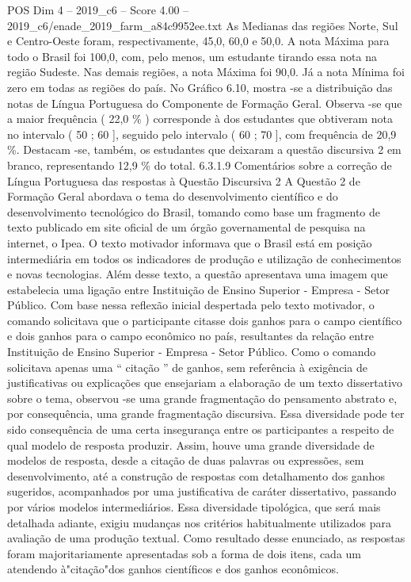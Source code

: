 \begin{textsample}{POS Dim 4 – 2019\_c6 – Score 4.00 – 2019\_c6/enade\_2019\_farm\_a84c9952ee.txt}
As Medianas das regiões Norte, Sul e Centro-Oeste foram, respectivamente, 45,0, 60,0 e 50,0.
A nota Máxima para todo o Brasil foi 100,0, com, pelo menos, um estudante tirando essa nota na região Sudeste.
Nas demais regiões, a nota Máxima foi 90,0.
Já a nota Mínima foi zero em todas as regiões do país.
No Gráfico 6.10, mostra -se a distribuição das notas de Língua Portuguesa do Componente de Formação Geral.
Observa -se que a maior frequência ( 22,0 \% ) corresponde à dos estudantes que obtiveram nota no intervalo ( 50 ; 60 ], seguido pelo intervalo ( 60 ; 70 ], com frequência de 20,9 \%.
Destacam -se, também, os estudantes que deixaram a questão discursiva 2 em branco, representando 12,9 \% do total. 6.3.1.9 Comentários sobre a correção de Língua Portuguesa das respostas à Questão Discursiva 2 A Questão 2 de Formação Geral abordava o tema do desenvolvimento científico e do desenvolvimento tecnológico do Brasil, tomando como base um fragmento de texto publicado em site oficial de um órgão governamental de pesquisa na internet, o Ipea.
O texto motivador informava que o Brasil está em posição intermediária em todos os indicadores de produção e utilização de conhecimentos e novas tecnologias.
Além desse texto, a questão apresentava uma imagem que estabelecia uma ligação entre Instituição de Ensino Superior - Empresa - Setor Público.
Com base nessa reflexão inicial despertada pelo texto motivador, o comando solicitava que o participante citasse dois ganhos para o campo científico e dois ganhos para o campo econômico no país, resultantes da relação entre Instituição de Ensino Superior - Empresa - Setor Público.
Como o comando solicitava apenas uma “ citação ” de ganhos, sem referência à exigência de justificativas ou explicações que ensejariam a elaboração de um texto dissertativo sobre o tema, observou -se uma grande fragmentação do pensamento abstrato e, por consequência, uma grande fragmentação discursiva.
Essa diversidade pode ter sido consequência de uma certa insegurança entre os participantes a respeito de qual modelo de resposta produzir.
Assim, houve uma grande diversidade de modelos de resposta, desde a citação de duas palavras ou expressões, sem desenvolvimento, até a construção de respostas com detalhamento dos ganhos sugeridos, acompanhados por uma justificativa de caráter dissertativo, passando por vários modelos intermediários.
Essa diversidade tipológica, que será mais detalhada adiante, exigiu mudanças nos critérios habitualmente utilizados para avaliação de uma produção textual.
Como resultado desse enunciado, as respostas foram majoritariamente apresentadas sob a forma de dois itens, cada um atendendo à"citação"dos ganhos científicos e dos ganhos econômicos.

\end{textsample}

